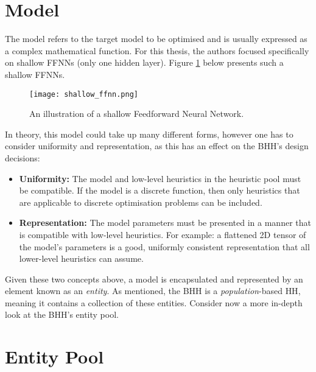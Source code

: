 \section{Model}
\label{sec:bhh:model}

The model refers to the target model to be optimised and is usually expressed as a complex mathematical function. For this thesis, the authors focused specifically on shallow \acp{FFNN} (only one hidden layer). Figure \ref{fig:shallow_ffnn} below presents such a shallow \acp{FFNN}.

\begin{figure}[H]
    \centering
    \texttt{[image: shallow\_ffnn.png]}
    \caption[Shallow Feedforward Neural Network]{An illustration of
    a shallow Feedforward Neural Network.}
    \label{fig:shallow_ffnn}
\end{figure}

In theory, this model could take up many different forms, however one has to consider uniformity and representation, as this has an effect on the \Ac{BHH}'s design decisions:

\begin{itemize}
    \item \textbf{Uniformity:} The model and low-level heuristics in the heuristic pool must be compatible. If the model is a discrete function, then only heuristics that are applicable to discrete optimisation problems can be included.
    \item \textbf{Representation:} The model parameters must be presented in a manner that is compatible with low-level heuristics. For example: a flattened 2D tensor of the model's parameters is a good, uniformly consistent representation that all lower-level heuristics can assume.
\end{itemize}

Given these two concepts above, a model is encapsulated and represented by an element known as an \textit{entity}. As mentioned, the \Ac{BHH} is a \textit{population}-based \Ac{HH}, meaning it contains a collection of these entities. Consider now a more in-depth look at the \Ac{BHH}'s entity pool.

\section{Entity Pool}
\label{sec:bhh:entity_pool}

